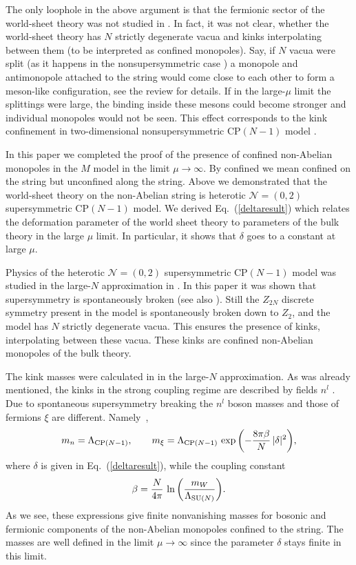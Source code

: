 \documentclass[12pt]{article}
\def\beq{\begin{equation}}
\def\eeq{\end{equation}}
\newcommand{\ntwoo}{${\mathcal N}= \left(0,2\right) $ }
\begin{document}
The only loophole in the above argument is that the fermionic sector of the world-sheet theory
was not studied in \cite{GSYmmodel}. In fact, it was not clear, whether the world-sheet theory has
$N$ strictly degenerate  vacua and kinks interpolating between them (to be interpreted as
confined  monopoles). Say, if $N$ vacua were split (as it happens in the nonsupersymmetric case
\cite{GSY05}) a monopole and antimonopole attached to the string would come close to
each other  to form a 
meson-like configuration, see the  review \cite{SYrev} for details. If in the large-$\mu$ limit the splittings
were large, the binding inside these mesons could become stronger and individual monopoles would not
be seen. This effect corresponds to the kink confinement in two-dimensional 
nonsupersymmetric CP$(N-1)$ model \cite{W79}.


In this paper we completed the proof of the presence of confined  non-Abelian monopoles
in the $M$ model in the limit $\mu\to\infty$. 
By confined we mean confined on the string but unconfined along the string.
Above we demonstrated that the world-sheet
theory on the non-Abelian string is heterotic \ntwoo supersymmetric CP$(N-1)$ model.
We derived Eq.~(\ref{deltaresult}) which relates the deformation parameter of the world sheet theory
to parameters of the bulk theory in the large $\mu$ limit. In particular, it shows that $\delta$
goes to a constant  at large $\mu$.

Physics of the heterotic \ntwoo supersymmetric CP$(N-1)$ model was studied in the large-$N$ approximation in \cite{SYhet2}. In this paper it was shown that supersymmetry is spontaneously broken (see also \cite{Thetdyn}). Still the $Z_{2N}$ discrete symmetry present in the model is
spontaneously broken down to $Z_2$, and the model has $N$ strictly degenerate vacua.
This ensures the presence of kinks, interpolating between these vacua. These kinks are
confined non-Abelian monopoles of the bulk theory.

The kink masses were calculated in \cite{SYhet2} in the large-$N$ approximation. As was already mentioned,
the kinks in the strong coupling regime are described by fields $n^l$ \cite{W79}. Due to spontaneous
supersymmetry breaking the $n^l$ boson masses and those of fermions $\xi$ are different. 
Namely~\cite{SYhet2},
\beq
m_n=\Lambda_{{\rm CP}(N-1)}, \qquad m_{\xi}=\Lambda_{{\rm CP}(N-1)}\,
\exp{\left(-\frac{8\pi\beta}{N}\,|\delta|^2\right)},
\label{kinkmass}
\eeq
where $\delta$ is given in Eq.~(\ref{deltaresult}), while the coupling constant
\beq
\beta=\frac{N}{4\pi}\,\ln{\left(\frac{m_W}{\Lambda_{{\rm SU}(N)}}\right)}.
\eeq
As we see, these expressions
give finite nonvanishing masses for bosonic and fermionic components of  the non-Abelian 
monopoles confined to the string. The masses are well defined in the limit $\mu\to\infty$
since the parameter $\delta$ stays finite in this limit.
\end{document}
